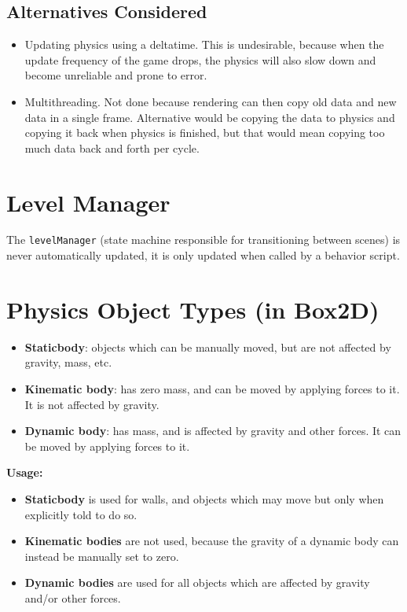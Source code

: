 \documentclass{article}
\begin{document}
\subsection{Alternatives Considered}
\begin{itemize}
  \item Updating physics using a deltatime. This is undesirable, because when the update frequency of the game drops, the physics will also slow down and become unreliable and prone to error.
  \item Multithreading. Not done because rendering can then copy old data and new data in a single frame. Alternative would be copying the data to physics and copying it back when physics is finished, but that would mean copying too much data back and forth per cycle.
\end{itemize}

\section{Level Manager}
The \texttt{levelManager} (state machine responsible for transitioning between scenes) is never automatically updated, it is only updated when called by a behavior script.

\section{Physics Object Types (in Box2D)}
\begin{itemize}
  \item \textbf{Staticbody}: objects which can be manually moved, but are not affected by gravity, mass, etc.
  \item \textbf{Kinematic body}: has zero mass, and can be moved by applying forces to it. It is not affected by gravity.
  \item \textbf{Dynamic body}: has mass, and is affected by gravity and other forces. It can be moved by applying forces to it.
\end{itemize}

\noindent
\textbf{Usage:}
\begin{itemize}
  \item \textbf{Staticbody} is used for walls, and objects which may move but only when explicitly told to do so.
  \item \textbf{Kinematic bodies} are not used, because the gravity of a dynamic body can instead be manually set to zero.
  \item \textbf{Dynamic bodies} are used for all objects which are affected by gravity and/or other forces.
\end{itemize}
\end{document}
